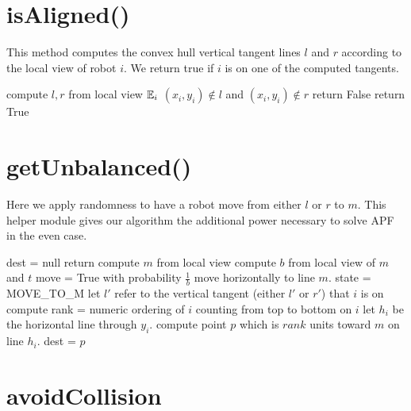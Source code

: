 \documentclass[preprint,10pt]{elsarticle}
\begin{document}
\clearpage %

\section{isAligned()} 

This method computes the convex hull vertical tangent lines $l$ and $r$ according
to the local view of robot $i$. We return true if $i$ is on one of the 
computed tangents.
\begin{algorithm}[H]
\begin{algorithmic}[1]
	\State compute $l,r$ from local view $\mathbb{E}_i$
	\If $(x_i, y_i) \notin  l$ and $(x_i, y_i) \notin r$
		\State return False
	\Else 
		\State return True
	\EndIf
\EndProcedure
\end{algorithmic}
\end{algorithm}

\section{getUnbalanced()} 
Here we apply randomness to have a robot move from either $l$ or $r$ to $m$.
This helper module gives our algorithm the additional power necessary to 
solve APF in the even case.
\begin{algorithm}[H]
\begin{algorithmic}[1]
		\State dest = null
		\State return
	\EndIf
	\State compute $m$ from local view
	\State compute $b$ from local view of $m$ and $t$
	\State move = True with probability $\frac{1}{b}$ \Comment move horizontally to line $m$. 
		\State state = MOVE\_TO\_M
		\State let $l'$ refer to the vertical tangent (either $l'$ or $r'$) that $i$ is on
		\State compute rank = numeric ordering of $i$ counting from top to bottom on $i$
		\State let $h_i$ be the horizontal line through $y_i$. 
		\State compute point $p$ which is $rank$ units toward $m$ on line $h_i$.
		\State dest = $p$
	\EndIf


\EndProcedure
\end{algorithmic}
\end{algorithm}

\section{avoidCollision} 
\end{document}
